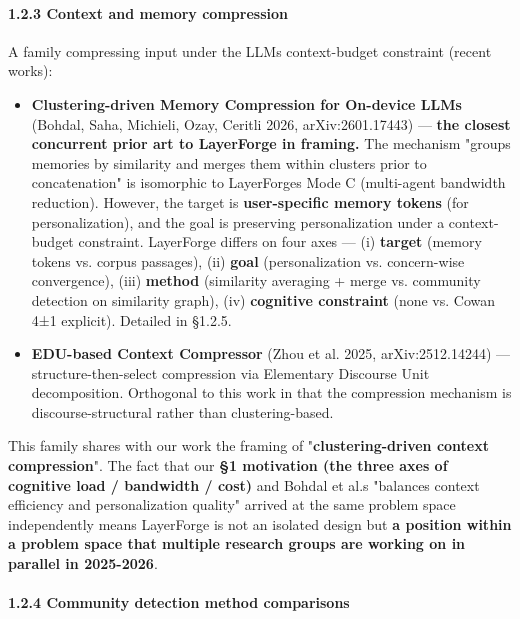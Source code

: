 \documentclass[
]{article}
\newcounter{none} %
\providecommand{\tightlist}{%
  \setlength{\itemsep}{0pt}\setlength{\parskip}{0pt}}
\begin{document}
\paragraph{1.2.3 Context and memory
compression}\label{123-context-and-memory-compression}

A family compressing input under the LLM\textquotesingle s
context-budget constraint (recent works):

\begin{itemize}
\tightlist
\item
  \textbf{Clustering-driven Memory Compression for On-device LLMs}
  (Bohdal, Saha, Michieli, Ozay, Ceritli 2026, arXiv:2601.17443) ---
  \textbf{the closest concurrent prior art to LayerForge in framing.}
  The mechanism "groups memories by similarity and merges them within
  clusters prior to concatenation" is isomorphic to
  LayerForge\textquotesingle s Mode C (multi-agent bandwidth reduction).
  However, the target is \textbf{user-specific memory tokens} (for
  personalization), and the goal is preserving personalization under a
  context-budget constraint. LayerForge differs on four axes --- (i)
  \textbf{target} (memory tokens vs. corpus passages), (ii)
  \textbf{goal} (personalization vs. concern-wise convergence), (iii)
  \textbf{method} (similarity averaging + merge vs. community detection
  on similarity graph), (iv) \textbf{cognitive constraint} (none vs.
  Cowan 4±1 explicit). Detailed in §1.2.5.
\item
  \textbf{EDU-based Context Compressor} (Zhou et al. 2025,
  arXiv:2512.14244) --- structure-then-select compression via Elementary
  Discourse Unit decomposition. Orthogonal to this work in that the
  compression mechanism is discourse-structural rather than
  clustering-based.
\end{itemize}

This family shares with our work the framing of
"\textbf{clustering-driven context compression}". The fact that our
\textbf{§1 motivation (the three axes of cognitive load / bandwidth /
cost)} and Bohdal et al.\textquotesingle s "balances context efficiency
and personalization quality" arrived at the same problem space
independently means LayerForge is not an isolated design but \textbf{a
position within a problem space that multiple research groups are
working on in parallel in 2025-2026}.

\paragraph{1.2.4 Community detection method
comparisons}\label{124-community-detection-method-comparisons}
\end{document}
